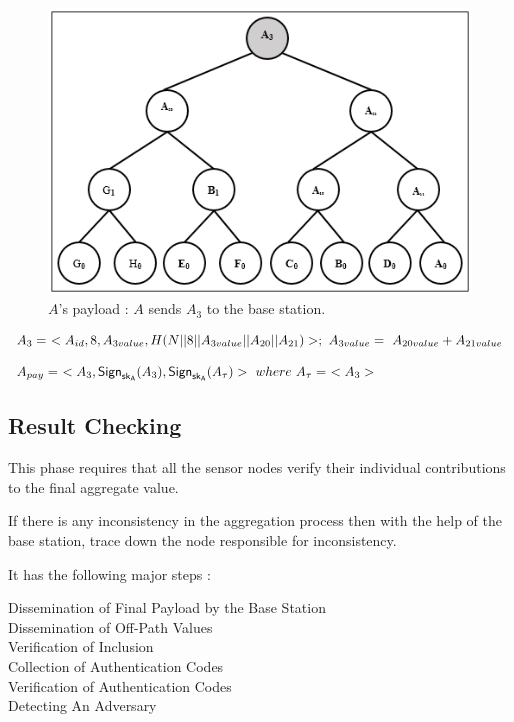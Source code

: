 \documentclass[%
  slidesonly,%
  semlayer%
  ]{seminar}                                  %
\newcommand{\sk}{\sf{sk}}
\begin{document}
\begin{slide}
      \begin{figure}[h!]
        \centering
        \includegraphics[scale = 0.5]{images/a-payload.png}
        \caption{$A$'s payload : $A$ sends $A_{3}$ to the base station.}
        \label{fig:a-payload}
      \end{figure}

      \begin{tiny}
      \begin{equation*}
        \begin{array}{l}
        A_{3} =\ <A_{id}, 8, A_{3value}, H(N||8||A_{3value}||A_{20}||A_{21})>;\ A_{3value} =\ A_{20value} + A_{21value}\\
        \\
        A_{pay} =\ <A_{3},\textsf{Sign}_{\sk_{A}}(A_{3}),\textsf{Sign}_{\sk_{A}}(A_{\tau})>\ where\ A_{\tau} =\ <A_{3}>
        \end{array}
      \end{equation*}
      \end{tiny}
     \vfill
     \clearpage

    \subsection*{Result Checking}
      This phase requires that all the sensor nodes verify their individual contributions to the final aggregate value.

      If there is any inconsistency in the aggregation process then with the help of the base station, trace down the node responsible for inconsistency.

      It has the following major steps :
      \begin{description}
        \item [Dissemination of Final Payload by the Base Station]
        \item [Dissemination of Off-Path Values]
        \item [Verification of Inclusion]
        \item [Collection of Authentication Codes]
        \item [Verification of Authentication Codes]
        \item [Detecting An Adversary]
      \end{description}


\end{slide}
\end{document}
